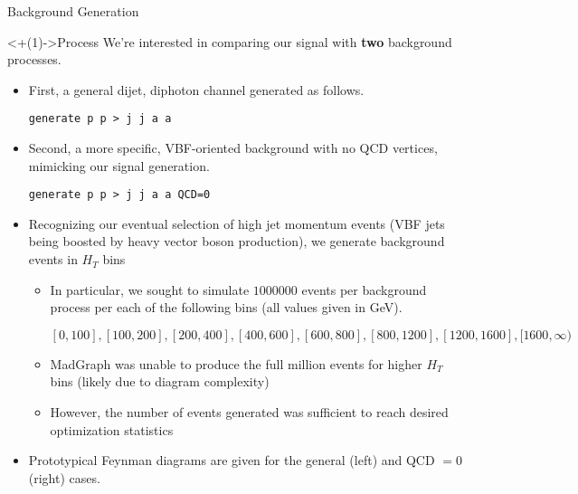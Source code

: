 \documentclass[]{beamer}
\begin{document}
\begin{frame}{Background Generation}
    \begin{block}<+(1)->{Process}
        We're interested in comparing our signal with \textbf{two} background processes. 
        \begin{itemize}[<+(1)->]
            \item First, a general dijet, diphoton channel generated as follows.
            
            \smallskip
            
            \texttt{generate p p > j j a a}
            \item Second, a more specific, VBF-oriented background with no QCD vertices, mimicking our signal generation.
            
            \smallskip
            
            \texttt{generate p p > j j a a QCD=0}
            \item Recognizing our eventual selection of high jet momentum events (VBF jets being boosted by heavy vector boson production), we generate background events in $H_T$ bins
            \begin{itemize}[<+(1)->]
                \item In particular, we sought to simulate $1000000$ events per background process per each of the following bins (all values given in GeV).
            
                \smallskip
            
                $[0,100], [100,200], [200,400], [400,600], [600,800], [800,1200], [1200,1600], [1600,\infty)$
                
                \smallskip
                
                \item MadGraph was unable to produce the full million events for higher $H_T$ bins (likely due to diagram complexity)
                \item However, the number of events generated was sufficient to reach desired optimization statistics
            \end{itemize}
            \item Prototypical Feynman diagrams are given for the general (left) and QCD $= 0$ (right) cases.
        \end{itemize}
    \end{block}
    

\end{frame}
\end{document}
